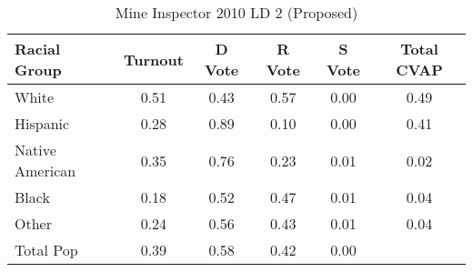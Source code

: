 \begin{table}[htb]
\begin{center}
\caption{Mine Inspector 2010 LD 2 (Proposed)}
\label{smine_cvap_ld_2}
\begin{tabular}{lccccc}
  \hline
Racial Group & Turnout & D Vote & R Vote & S Vote & Total CVAP \\ 
  \hline
White & 0.51 & 0.43 & 0.57 & 0.00 & 0.49 \\ 
  Hispanic & 0.28 & 0.89 & 0.10 & 0.00 & 0.41 \\ 
  Native American & 0.35 & 0.76 & 0.23 & 0.01 & 0.02 \\ 
  Black & 0.18 & 0.52 & 0.47 & 0.01 & 0.04 \\ 
  Other & 0.24 & 0.56 & 0.43 & 0.01 & 0.04 \\ 
  Total Pop & 0.39 & 0.58 & 0.42 & 0.00 &  \\ 
   \hline
\end{tabular}
\end{center}
\end{table}
